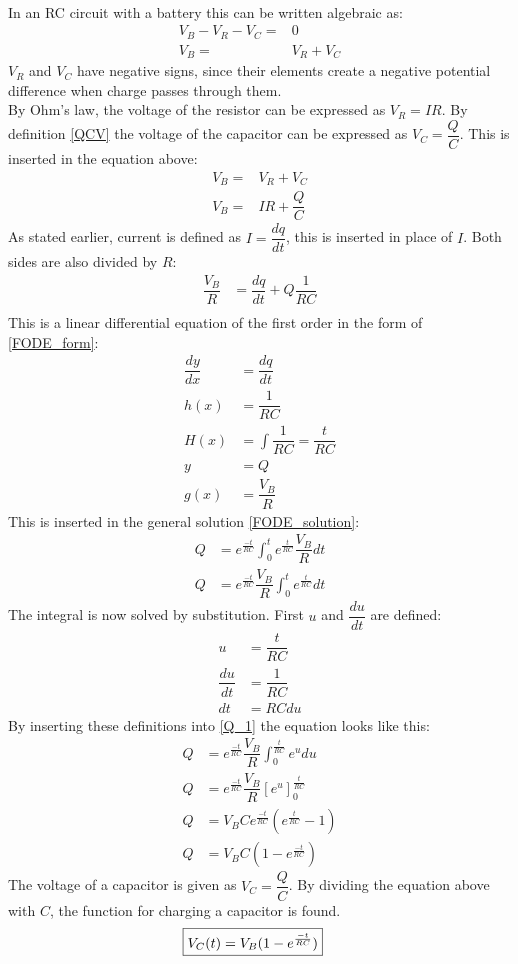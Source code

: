 \\
In an RC circuit with a battery this can be written algebraic as:
\begin{align*}
V_B-V_R-V_C =& 0 \\
V_B=&V_R+V_C
\end{align*}
$V_R$ and $V_C$ have negative signs, since their elements create a negative potential difference when charge passes through them.
\\
By Ohm's law, the voltage of the resistor can be expressed as $V_R=IR$. By definition \eqref{QCV} the voltage of the capacitor can be expressed as $V_C=\dfrac{Q}{C}$. This is inserted in the equation above:
\begin{align*}
V_B=&V_R+V_C \\
V_B =& IR+\dfrac{Q}{C}
\end{align*}
As stated earlier, current is defined as $I =\dfrac{dq}{dt}$, this is inserted in place of $I$. Both sides are also divided by $R$:
\begin{align*}
\dfrac{V_B}{R} &= \dfrac{dq}{dt} + Q\dfrac{1}{RC} \\
\end{align*}
This is a linear differential equation of the first order in the form of \eqref{FODE_form}:
\begin{align*}
\dfrac{dy}{dx}&=\dfrac{dq}{dt}
\\
h(x)&=\dfrac{1}{RC}
\\
H(x)&=\int \dfrac{1}{RC}=\dfrac{t}{RC}
\\
y &= Q
\\
g(x)&= \dfrac{V_B}{R}
\end{align*}
This is inserted in the general solution \eqref{FODE_solution}:
\begin{align}
Q&= e^{\frac{-t}{RC}}\int_{0}^{t}e^{\frac{t}{RC}}\dfrac{V_B}{R}dt
\\
Q&= e^{\frac{-t}{RC}}\dfrac{V_B}{R}\int_{0}^{t}e^{\frac{t}{RC}}dt \label{Q_1}
\end{align}
The integral is now solved by substitution. First $u$ and $\dfrac{du}{dt}$ are defined:
\begin{align*}
u &= \dfrac{t}{RC}
\\
\dfrac{du}{dt}&=\dfrac{1}{RC}
\\
dt &=RC du
\end{align*} 
By inserting these definitions into \eqref{Q_1} the equation looks like this:
\begin{align*}
Q&=e^{\frac{-t}{RC}}\dfrac{V_B}{R}\int_{0}^{\frac{t}{RC}}e^u du
\\
Q&=e^{\frac{-t}{RC}}\dfrac{V_B}{R}[e^u]_{0}^{\frac{t}{RC}}
\\
Q&=V_B C e^{\frac{-t}{RC}}(e^{\frac{t}{RC}}-1)
\\
Q&=V_B C (1-e^{\frac{-t}{RC}})
\end{align*} 
The voltage of a capacitor is given as $V_C=\dfrac{Q}{C}$. By dividing the equation above with $C$, the function for charging a capacitor is found.
\begin{align}
\label{V_up}
\Aboxed{
V_C(t)=V_B(1-e^{\frac{-t}{RC}})
}
\end{align}
